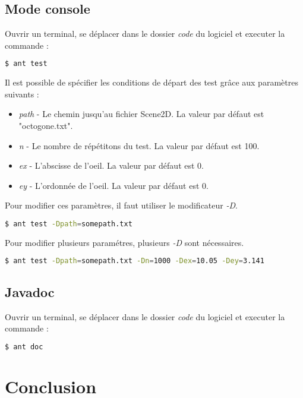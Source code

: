 \documentclass[11pts]{article}
\begin{document}
\subsection*{Mode console}
Ouvrir un terminal, se déplacer dans le dossier \emph{code} du logiciel et executer la commande :
\begin{lstlisting}[language=bash]
$ ant test
\end{lstlisting}
Il est possible de spécifier les conditions de départ des test grâce aux paramètres suivants :
\begin{itemize}%
\item \emph{path} - Le chemin jusqu'au fichier Scene2D. La valeur par défaut est "octogone.txt".
\item \emph{n} - Le nombre de répétitons du test. La valeur par défaut est 100.
\item \emph{ex} - L'abscisse de l'oeil. La valeur par défaut est 0.
\item \emph{ey} - L'ordonnée de l'oeil. La valeur par défaut est 0.
\end{itemize}
Pour modifier ces paramètres, il faut utiliser le modificateur \emph{-D}.
\begin{lstlisting}[language=bash]
$ ant test -Dpath=somepath.txt
\end{lstlisting}
Pour modifier plusieurs paramétres, plusieurs \emph{-D} sont nécessaires.
\begin{lstlisting}[language=bash]
$ ant test -Dpath=somepath.txt -Dn=1000 -Dex=10.05 -Dey=3.141
\end{lstlisting}
\subsection*{Javadoc}
Ouvrir un terminal, se déplacer dans le dossier \emph{code} du logiciel et executer la commande :
\begin{lstlisting}[language=bash]
$ ant doc
\end{lstlisting}


\newpage
\section{Conclusion}
\end{document}

